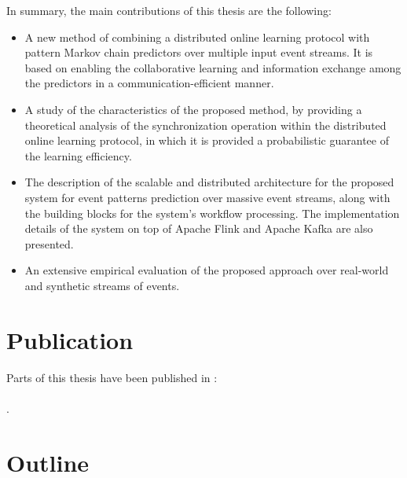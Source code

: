 In summary, the main contributions of this thesis are the following:

\begin{itemize}

	\item  A new method of combining a distributed online learning protocol \cite{kamp2016communication} with pattern Markov chain predictors \cite{alevizos2017event} over multiple input event streams. It is based on enabling the collaborative learning and information exchange among the predictors in a communication-efficient manner.  
	
	\item A study of the characteristics of the proposed method, by providing a theoretical analysis of the synchronization operation within the distributed online learning protocol, in which it is provided a probabilistic guarantee of the learning efficiency. 
	
	\item The description of the scalable and distributed architecture for the proposed system for event patterns prediction over massive event streams, along with the building blocks for the system's workflow processing. The implementation details of the system on top of Apache Flink and Apache Kafka are also presented. 
	
	\item An extensive empirical evaluation of the proposed approach over real-world and synthetic streams of events.
  
\end{itemize}


\section{Publication}

Parts of this thesis have been published in \cite{Qadah}:\\ \\
.

\section{Outline }

	

